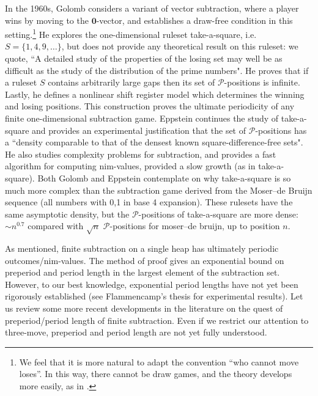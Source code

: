 \documentclass{amsart}
\theoremstyle{plain}
\theoremstyle{definition}
\renewcommand{\P}{\ensuremath{\mathcal P}}
\begin{document}
In the 1960s, Golomb  \cite{golomb1966mathematical} considers a variant of {\sc vector subtraction}, where a player wins by moving to the $\boldsymbol{0}$-vector, and establishes a draw-free condition in this setting.\footnote{We feel that it is more natural to adapt the convention ``who cannot move loses''. In this way, there cannot be draw games, and the theory develops more easily, as in \cite{larsson2012operator,larsson2013heaps}.} 
He explores the one-dimensional ruleset {\sc take-a-square}, i.e. $S=\{1,4,9,\ldots \}$, but does not provide any theoretical result on this ruleset: we quote, ``A detailed study of the properties of the losing set may well be as difficult as the study of the distribution of the prime numbers". He proves that if a ruleset $S$ contains arbitrarily large gaps then its set of \P-positions is infinite. Lastly, he defines a nonlinear shift register model which determines the winning and losing positions. This construction proves the ultimate periodicity of any finite one-dimensional subtraction game. 
Eppstein  \cite{eppstein2018faster}  continues the study of {\sc take-a-square} and provides an experimental justification that the set of \P-positions  has a ``density comparable to that of the densest known square-difference-free sets". He also studies complexity problems for {\sc subtraction}, and provides a fast algorithm for computing nim-values, provided a slow growth (as in {\sc take-a-square}). Both Golomb and Eppstein contemplate on why {\sc take-a-square} is so much more complex than the subtraction game derived from the Moser–de Bruijn sequence (all numbers with 0,1 in base 4 expansion). These rulesets have the same asymptotic density, but the \P-positions of  {\sc take-a-square} are more dense: $\sim n^{0.7}$ compared with $\sqrt{n}$ \P-positions for {\sc moser–de bruijn}, up to position $n$.

 
As mentioned, {\sc finite subtraction} on a single heap has ultimately periodic outcomes/nim-values. The method of proof gives an exponential bound on preperiod and period length in the largest element of the subtraction set. However, to our best knowledge,  exponential period lengths have not yet been rigorously established (see Flammencamp's thesis \cite{Flammenkamp_1997} for experimental results). Let us review some more recent developments in the literature on the quest of preperiod/period length of {\sc finite subtraction}. 
Even if we restrict our attention to {\sc three-move}, preperiod and period length are not yet fully understood. 
\end{document}
